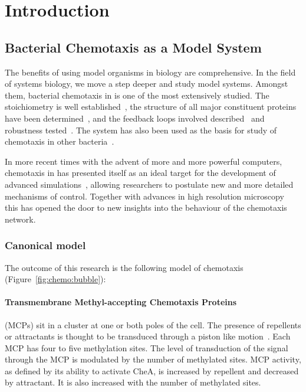\documentclass[../main.tex]{subfiles}
\begin{document}
\section{Introduction}

\subsection{Bacterial Chemotaxis as a Model System}
The benefits of using model organisms in biology are comprehensive. In the field of systems biology, we move a step deeper and study model systems. Amongst them, bacterial chemotaxis in \ecolilong is one of the most extensively studied. The stoichiometry is well established~\citep{li04}, the structure of all major constituent proteins have been determined~\citep{zhou02, milligan87, stock89}, and the feedback loops involved described~\citep{kentner09} and robustness tested~\citep{yi00}. The \ecoli system has also been used as the basis for study of chemotaxis in other bacteria~\citep{hamadeh11}.

In more recent times with the advent of more and more powerful computers, chemotaxis in \ecoli has presented itself as an ideal target for the development of advanced simulations~\citep{bray93, lipkow05, miller10}, allowing researchers to postulate new and more detailed mechanisms of control. Together with advances in high resolution microscopy~\citep{greenfield09} this has opened the door to new insights into the behaviour of the \ecoli chemotaxis network.

\subsubsection{Canonical model}

The outcome of this research is the following model of chemotaxis (Figure~\ref{fig:chemo:bubble}):

\paragraph{Transmembrane Methyl-accepting Chemotaxis Proteins} (MCPs) sit in a cluster at one or both poles of the cell. The presence of repellents or attractants is thought to be transduced through a piston like motion~\citep{hall11}. Each MCP has four to five methylation sites. The level of transduction of the signal through the MCP is modulated by the number of methylated sites. MCP activity, as defined by its ability to activate CheA, is increased by repellent and decreased by attractant. It is also increased with the number of methylated sites.
\end{document}
